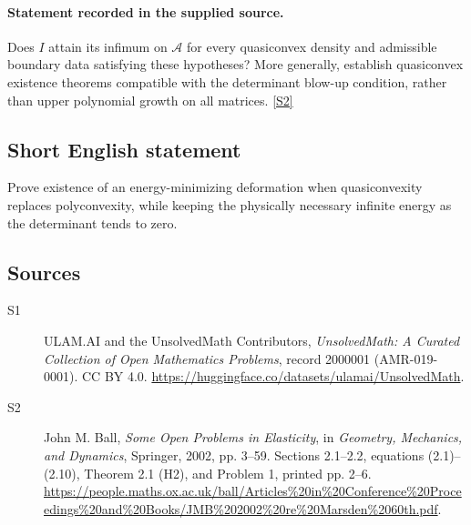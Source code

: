 \documentclass[11pt]{book}
\newcommand{\sref}[2]{\hyperlink{source:#1:#2}{[S#2]}}
\begin{document}
\paragraph{Statement recorded in the supplied source.}
Does $I$ attain its infimum on $\mathcal A$ for every quasiconvex density and admissible boundary data satisfying these hypotheses? More generally, establish quasiconvex existence theorems compatible with the determinant blow-up condition, rather than upper polynomial growth on all matrices. \sref{2000001}{2}
\subsection{Short English statement}
Prove existence of an energy-minimizing deformation when quasiconvexity replaces polyconvexity, while keeping the physically necessary infinite energy as the determinant tends to zero.
\subsection{Sources}
\begin{description}
\item[\hypertarget{source:2000001:1}{S1}] ULAM.AI and the UnsolvedMath Contributors, \emph{UnsolvedMath: A Curated Collection of Open Mathematics Problems}, record 2000001 (AMR-019-0001). CC BY 4.0. \url{https://huggingface.co/datasets/ulamai/UnsolvedMath}.
\item[\hypertarget{source:2000001:2}{S2}] John M. Ball, \emph{Some Open Problems in Elasticity}, in \emph{Geometry, Mechanics, and Dynamics}, Springer, 2002, pp. 3--59. Sections 2.1--2.2, equations (2.1)--(2.10), Theorem 2.1 (H2), and Problem 1, printed pp. 2--6. \url{https://people.maths.ox.ac.uk/ball/Articles%20in%20Conference%20Proceedings%20and%20Books/JMB%202002%20re%20Marsden%2060th.pdf}.
\end{description}
\label{end:2000001}
\end{document}
